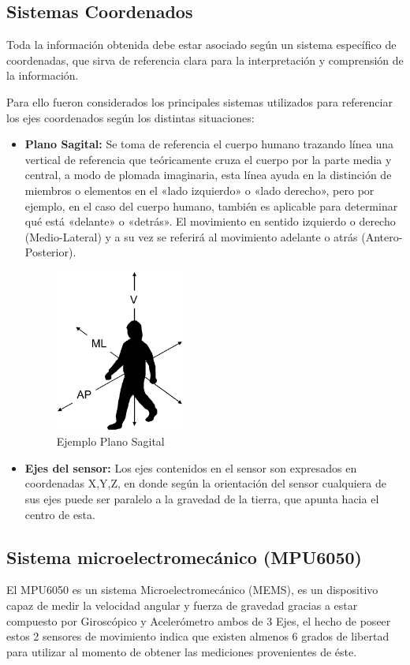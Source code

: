 \documentclass[12pt,a4paper]{article}
\begin{document}
\subsection{Sistemas Coordenados}
Toda la información obtenida debe estar asociado según un sistema específico de coordenadas, que sirva de referencia clara para la interpretación y comprensión de la información.

Para ello fueron considerados los principales sistemas utilizados para referenciar los ejes coordenados según los distintas situaciones:
\begin{itemize}
	
	\item \textbf{Plano Sagital:} Se toma de referencia el cuerpo humano trazando línea una  vertical de referencia que teóricamente cruza el cuerpo por la parte media y central, a modo de plomada imaginaria, esta línea ayuda en la distinción de miembros o elementos en el «lado izquierdo» o «lado derecho», pero por ejemplo, en el caso del cuerpo humano, también es aplicable para determinar qué está «delante» o «detrás». El movimiento en sentido izquierdo o derecho (Medio-Lateral) y a su vez se referirá al movimiento adelante o atrás (Antero-Posterior).
		\begin{figure}[H]
			\centering
			\includegraphics[width=0.4\textwidth]{images/sagital}
			\caption{Ejemplo Plano Sagital}
			\label{fig:sagital}
		\end{figure}
	
	\item \textbf{Ejes del sensor:} Los ejes contenidos en el sensor son expresados en coordenadas X,Y,Z, en donde según la orientación del sensor cualquiera de sus ejes puede ser paralelo a la gravedad de la tierra, que apunta hacia el centro de esta.
\end{itemize}

\subsection{Sistema microelectromecánico (MPU6050)}
El MPU6050\cite{MPU6050} es un sistema Microelectromecánico (MEMS), es un dispositivo capaz de medir la velocidad angular y fuerza de gravedad gracias a estar compuesto por Giroscópico y Acelerómetro ambos de 3 Ejes, el hecho de poseer estos 2 sensores de movimiento indica que existen almenos 6 grados de libertad para utilizar al momento de obtener las mediciones provenientes de éste.
\end{document}
